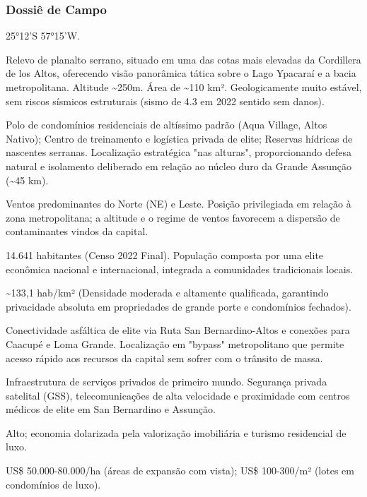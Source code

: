 \subsubsection{Dossiê de Campo}
\begin{description}[style=nextline,leftmargin=0.5cm,font=\bfseries]
\item[Coordenadas]  25°12'S 57°15'W.
\item[Topografia]  Relevo de planalto serrano, situado em uma das cotas mais elevadas da Cordillera de los Altos, oferecendo visão panorâmica tática sobre o Lago Ypacaraí e a bacia metropolitana. Altitude \textasciitilde 250m. Área de \textasciitilde 110 km². Geologicamente muito estável, sem riscos sísmicos estruturais (sismo de 4.3 em 2022 sentido sem danos).
\item[Alvos Estratégicos]  Polo de condomínios residenciais de altíssimo padrão (Aqua Village, Altos Nativo); Centro de treinamento e logística privada de elite; Reservas hídricas de nascentes serranas. Localização estratégica "nas alturas", proporcionando defesa natural e isolamento deliberado em relação ao núcleo duro da Grande Assunção (\textasciitilde 45 km).
\item[Fallout]  Ventos predominantes do Norte (NE) e Leste. Posição privilegiada em relação à zona metropolitana; a altitude e o regime de ventos favorecem a dispersão de contaminantes vindos da capital.
\item[População]  14.641 habitantes (Censo 2022 Final). População composta por uma elite econômica nacional e internacional, integrada a comunidades tradicionais locais.
\item[Densidade]  \textasciitilde 133,1 hab/\allowbreak km² (Densidade moderada e altamente qualificada, garantindo privacidade absoluta em propriedades de grande porte e condomínios fechados).
\item[Vias de Acesso]  Conectividade asfáltica de elite via Ruta San Bernardino-Altos e conexões para Caacupé e Loma Grande. Localização em "bypass" metropolitano que permite acesso rápido aos recursos da capital sem sofrer com o trânsito de massa.
\item[Serviços]  Infraestrutura de serviços privados de primeiro mundo. Segurança privada satelital (GSS), telecomunicações de alta velocidade e proximidade com centros médicos de elite em San Bernardino e Assunção.
\item[Custo de Vida]  Alto; economia dolarizada pela valorização imobiliária e turismo residencial de luxo.
\item[Preço da Terra]  US\$ 50.000-80.000/\allowbreak ha (áreas de expansão com vista); US\$ 100-300/\allowbreak m² (lotes em condomínios de luxo).

\end{description}
